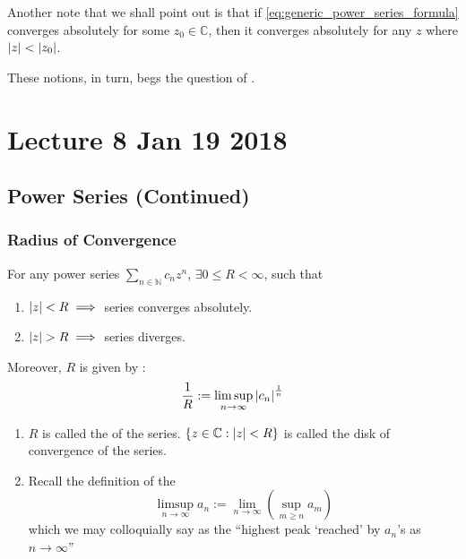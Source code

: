\documentclass[notoc,notitlepage]{tufte-book}
\begin{document}
Another note that we shall point out is that if \cref{eq:generic_power_series_formula} converges absolutely for some $z_0 \in \mathbb{C}$, then it converges absolutely for any $z$ where $\left|z\right| < \left|z_0\right|$.

These notions, in turn, begs the question of .




\chapter{Lecture 8 Jan 19 2018}
	\label{chapter:lecture_8_jan_19_2018}

\section{Power Series (Continued)} %
\label{sec:power_series_continued}

\subsection{Radius of Convergence} %
\label{sub:radius_of_convergence}

\begin{thm}\label{thm:convergence_in_the_radius_of_convergence}
	For any power series $\sum_{n \in \mathbb{N}} c_n z^n$, $\exists 0 \leq R < \infty$, such that
	\begin{enumerate}
		\item $\left|z\right| < R \implies $ series converges absolutely.
		\item $\left|z\right| > R \implies $ series diverges.
	\end{enumerate}
	Moreover, $R$ is given by :
	\begin{equation}\label{eq:hadamards_formula}
		\frac{1}{R} := \limsup_{n \to \infty} \left|c_n\right|^\frac{1}{n}
	\end{equation}
\end{thm}

\begin{remark}
	\begin{enumerate}
		\item $R$ is called the  of the series. $\{z \in \mathbb{C} : \left|z\right| < R\}$ is called the disk of convergence of the series.
		\item Recall the definition of the 
		\begin{equation}
			\label{eq:defn_limsup}
			\limsup_{n \to \infty} a_n := \lim_{n \to \infty} (\sup_{m \geq n} a_m)
		\end{equation}
		which we may colloquially say as the ``highest peak `reached' by $a_n$'s as $n \to \infty$''
	\end{enumerate}
\end{remark}
\end{document}

